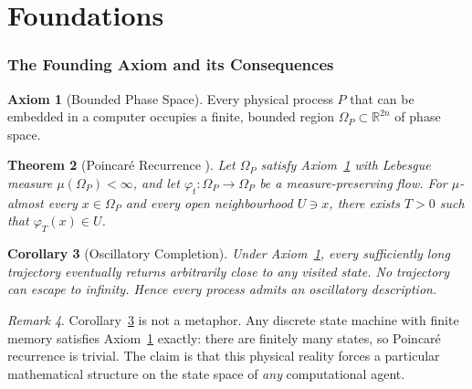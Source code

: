 \documentclass[twocolumn,11pt,a4paper]{article}
\theoremstyle{plain}
\newtheorem{theorem}{Theorem}[section]
\newtheorem{corollary}[theorem]{Corollary}
\theoremstyle{definition}
\newtheorem{axiom}[theorem]{Axiom}
\theoremstyle{remark}
\newtheorem{remark}[theorem]{Remark}
\newcommand{\R}{\mathbb{R}}
\begin{document}
\tableofcontents
\clearpage

\part{Foundations}

\section{The Founding Axiom and its Consequences}
\label{sec:axiom}

\begin{axiom}[Bounded Phase Space]
\label{ax:bounded}
Every physical process $P$ that can be embedded in a computer occupies a finite, bounded region $\Omega_P \subset \R^{2n}$ of phase space.
\end{axiom}

\begin{theorem}[Poincar\'e Recurrence \citep{poincare1890,walters1982}]
\label{thm:poincare}
Let $\Omega_P$ satisfy Axiom~\ref{ax:bounded} with Lebesgue measure $\mu(\Omega_P) < \infty$, and let $\varphi_t : \Omega_P \to \Omega_P$ be a measure-preserving flow.  For $\mu$-almost every $x \in \Omega_P$ and every open neighbourhood $U \ni x$, there exists $T > 0$ such that $\varphi_T(x) \in U$.
\end{theorem}

\begin{corollary}[Oscillatory Completion]
\label{cor:oscillatory}
Under Axiom~\ref{ax:bounded}, every sufficiently long trajectory eventually returns arbitrarily close to any visited state.  No trajectory can escape to infinity.  Hence every process admits an oscillatory description.
\end{corollary}

\begin{remark}
Corollary~\ref{cor:oscillatory} is not a metaphor.  Any discrete state machine with finite memory satisfies Axiom~\ref{ax:bounded} exactly: there are finitely many states, so Poincar\'e recurrence is trivial.  The claim is that this physical reality forces a particular mathematical structure on the state space of \emph{any} computational agent.
\end{remark}
\end{document}
